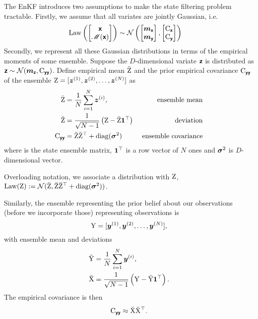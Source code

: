 \documentclass{article}
\begin{document}
The EnKF introduces two assumptions to make the state filtering problem tractable.
Firstly, we assume that all variates are jointly Gaussian, i.e.
\begin{align}
    \operatorname{Law} \left( \begin{bmatrix}
        \boldsymbol{\mathsf{x}}\\
        \mathscr{M}(\boldsymbol{\mathsf{x}})
    \end{bmatrix}\right) &\sim \mathcal{N}\left(
        \begin{bmatrix}
            \boldsymbol{m}_{\boldsymbol{\mathsf{x}}}\\
            \boldsymbol{m}_{\boldsymbol{\mathsf{y}}}
        \end{bmatrix},
        \begin{bmatrix}
            \mathrm{C}_{\boldsymbol{\mathsf{x}}}\\
            \mathrm{C}_{\boldsymbol{\mathsf{y}}}
        \end{bmatrix}
    \right)
\end{align}
Secondly, we represent all these Gaussian distributions in terms of the empirical moments of some ensemble.
Suppose the $D$-dimensional variate $\boldsymbol{\mathsf{z}}$ is distributed as
$\boldsymbol{\mathsf{z}}\sim\mathcal{N}(\boldsymbol{m}_{\boldsymbol{\mathsf{z}}},\mathrm{C}_{\boldsymbol{\mathsf{yy}}})$.
Define empirical mean $\bar{\mathrm{Z}}$ and the prior empirical covariance $\mathrm{C}_{\boldsymbol{\mathsf{yy}}}$ of the ensemble  $\mathrm{Z} = [\boldsymbol{z}^{(1)}, \boldsymbol{z}^{(2)}, \dots, \boldsymbol{z}^{(N)}]$ as
\begin{align}
    \bar{\mathrm{Z}} &= \frac{1}{N} \sum_{i=1}^N \boldsymbol{z}^{(i)}, \label{eq:ensemble_mean} & \text{ ensemble mean} \\
    \breve{\mathrm{Z}} &= \frac{1}{\sqrt{N-1}} \left( \mathrm{Z} - \bar{\mathrm{Z}} \boldsymbol{1}^\top \right) &\text{ deviation}  \label{eq:deviation_matrix} \\
    \mathrm{C}_{\boldsymbol{\mathsf{yy}}} &= \breve{\mathrm{Z}} \breve{\mathrm{Z}}^\top + \operatorname{diag}(\boldsymbol{\sigma}^2)&\text{ ensemble covariance}  \label{eq:ensemble-covariance}
\end{align}
where is the state ensemble matrix, $\boldsymbol{1}^\top$ is a row vector of $N$ ones and $\boldsymbol{\sigma}^2$ is $D$-dimensional vector.

Overloading notation, we associate a distribution with $\mathrm{Z}$,
$\operatorname{Law}(\mathrm{Z}) := \mathcal{N}(\bar{\mathrm{Z}}, \breve{\mathrm{Z}} \breve{\mathrm{Z}}^\top + \operatorname{diag}(\boldsymbol{\sigma}^2))$.


Similarly, the ensemble representing the prior belief about our observations (before we incorporate those) representing observations is
\begin{equation}
    \mathrm{Y} = [\boldsymbol{y}^{(1)}, \boldsymbol{y}^{(2)}, \dots, \boldsymbol{y}^{(N)}],
\end{equation}
with ensemble mean and deviations
\begin{align}
    \breve{\mathrm{Y}} &= \frac{1}{N} \sum_{i=1}^N \boldsymbol{y}^{(i)}, \\
    \breve{\mathrm{X}} &= \frac{1}{\sqrt{N-1}} \left( \mathrm{Y} - \breve{\mathrm{Y}} \boldsymbol{1}^\top \right).
\end{align}
The empirical covariance is then
\begin{equation}
    \mathrm{C}_{\boldsymbol{\mathsf{yy}}} \approx \breve{\mathrm{X}} \breve{\mathrm{X}}^\top.
\end{equation}
\end{document}

